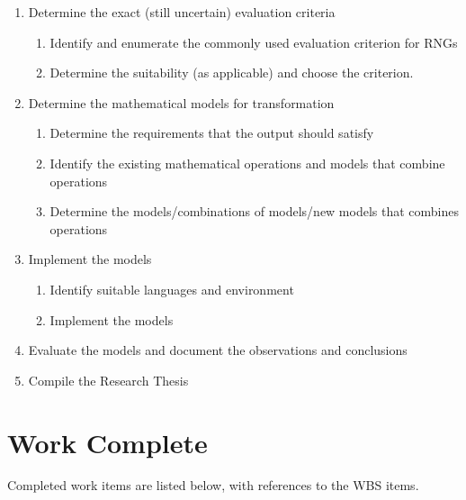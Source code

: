 \documentclass{scrartcl}
\begin{document}
\begin{enumerate}[ref=\theenumi]
            \item Determine the exact (still uncertain) evaluation criteria
            \begin{enumerate}[ref=\theenumi.\theenumii]
                \item\label{id_eval} Identify and enumerate the commonly used evaluation criterion for RNGs
                \item\label{det_suit} Determine the suitability (as applicable) and choose the criterion.
            \end{enumerate}
            
            \item Determine the mathematical models for transformation
            \begin{enumerate}[ref=\theenumi.\theenumii]
                \item\label{det_requ} Determine the requirements that the output should satisfy
                \item\label{id_math_models} Identify the existing mathematical operations and models that combine operations
                \item\label{det_models_ops} Determine the models/combinations of models/new models that combines operations
            \end{enumerate}
            
            \item Implement the models
            \begin{enumerate}[ref=\theenumi.\theenumii]
                \item\label{id_lang_env} Identify suitable languages and environment
                \item\label{impl} Implement the models
            \end{enumerate}
            
            \item\label{test} Evaluate the models and document the observations and conclusions
            
            \item\label{thesis} Compile the Research Thesis
        \end{enumerate}
\newpage\section{Work Complete}
Completed work items are listed below, with references to the WBS items.
\end{document}
